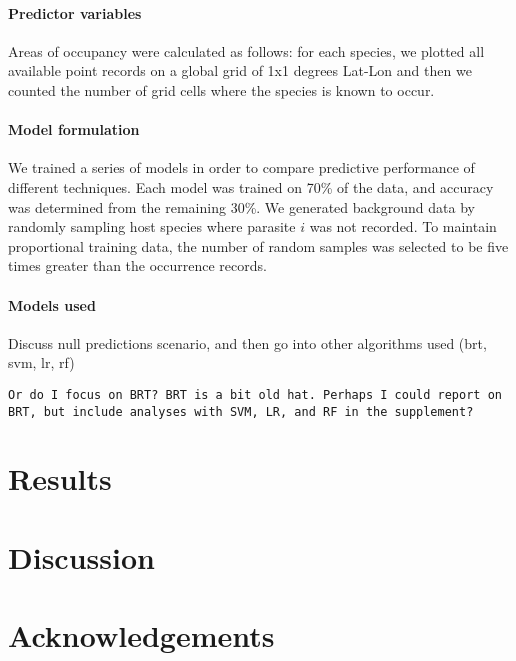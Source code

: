 \documentclass[12pt]{article}
\begin{document}
 
 \paragraph{Predictor variables}
 
 Areas of occupancy were calculated as follows: for each species, we plotted all available point records on a global grid of 1x1 degrees  Lat-Lon and then we counted the number of grid cells where the species is known to occur.
 
 
 \paragraph{Model formulation}
  We trained a series of models in order to compare predictive performance of different techniques. Each model was trained on 70\% of the data, and accuracy was determined from the remaining 30\%. We generated background data by randomly sampling host species where parasite $i$ was not recorded. To maintain proportional training data, the number of random samples was selected to be five times greater than the occurrence records. 
  
  
 \paragraph{Models used}
 Discuss null predictions scenario, and then go into other algorithms used (brt, svm, lr, rf)

\texttt{Or do I focus on BRT? BRT is a bit old hat. Perhaps I could report on BRT, but include analyses with SVM, LR, and RF in the supplement?}



 
 
  
\section{Results}



  
  
  


\section{Discussion}
 
 
 
 
 
 
 
\section{Acknowledgements}
\end{document}

